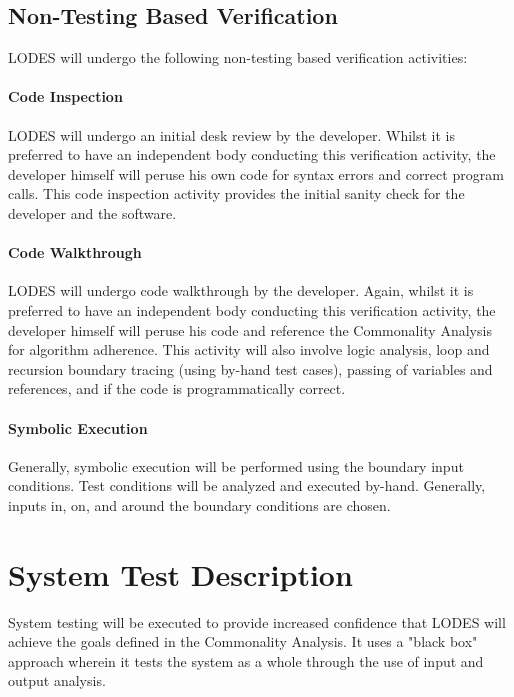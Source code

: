 \documentclass[12pt, titlepage]{article}
\newcommand{\famname}{LODES} %
\begin{document}

\subsection{Non-Testing Based Verification}
\famname{} will undergo the following non-testing based verification activities:

\paragraph{Code Inspection\\}
\famname{} will undergo an initial desk review by the developer. Whilst it is preferred to have an independent body conducting this verification activity, the developer himself will peruse his own code for syntax errors and correct program calls. This code inspection activity provides the initial sanity check for the developer and the software.

\paragraph{Code Walkthrough\\}
\famname{} will undergo code walkthrough by the developer. Again, whilst it is preferred to have an independent body conducting this verification activity, the developer himself will peruse his code and reference the Commonality Analysis for algorithm adherence. This activity will also involve logic analysis, loop and recursion boundary tracing (using by-hand test cases), passing of variables and references, and if the code is programmatically correct.

\paragraph{Symbolic Execution\\}
Generally, symbolic execution will be performed using the boundary input conditions. Test conditions will be analyzed and executed by-hand. Generally, inputs in, on, and around the boundary conditions are chosen.


\section{System Test Description}
System testing will be executed to provide increased confidence that \famname{} will achieve the goals defined in the Commonality Analysis. It uses a "black box" approach wherein it tests the system as a whole through the use of input and output analysis.
\end{document}

